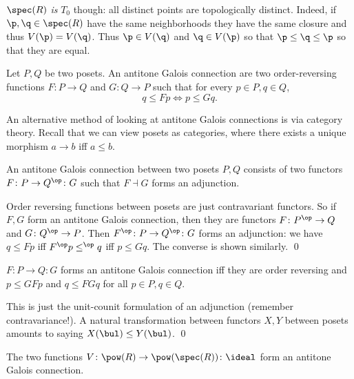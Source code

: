     $\spec(R)$ {\it is\/} $T_0$ though: all distinct points are topologically distinct.
    Indeed, if $\p,\q\in\spec(R)$ have the same neighborhoods they have the same closure and thus $V(\p)=V(\q)$.
    Thus $\p\in V(\q)$ and $\q\in V(\p)$ so that $\p\leq\q\leq\p$ so that they are equal.

\eexam

\bdefn

    Let $P,Q$ be two posets.
    An {\emphcolor antitone Galois connection} are two order-reversing functions $F\colon P\to Q$ and $G\colon Q\to P$ such that for every $p\in P,q\in Q$,
    $$ q \leq Fp \iff p \leq Gq . $$

\edefn

An alternative method of looking at antitone Galois connections is via category theory.
Recall that we can view posets as categories, where there exists a unique morphism $a\to b$ iff $a\leq b$.

\bprop

    An antitone Galois connection between two posets $P,Q$ consists of two functors $F\colon P\to Q^\op\colon G$ such that $F\dashv G$ forms an adjunction.

\eprop

\bproof

    Order reversing functions between posets are just contravariant functors.
    So if $F,G$ form an antitone Galois connection, then they are functors $F\colon P^\op\to Q$ and $G\colon Q^\op\to P$.
    Then $F^\op\colon P\to Q^\op\colon G$ forms an adjunction: we have $q\leq Fp$ iff $F^\op p\leq^\op q$ iff $p\leq Gq$.
    The converse is shown similarly.
    \qed

\eproof

\bcoro

    $F\colon P\to Q\colon G$ forms an antitone Galois connection iff they are order reversing and $p\leq GFp$ and $q\leq FGq$ for all $p\in P,q\in Q$.

\ecoro

\bproof

    This is just the unit-counit formulation of an adjunction (remember contravariance!).
    A natural transformation between functors $X,Y$ between posets amounts to saying $X(\bul)\leq Y(\bul)$.
    \qed

\eproof

\bcoro

    The two functions $V\colon\pow(R)\to\pow(\spec(R))\colon\ideal$ form an antitone Galois connection.

